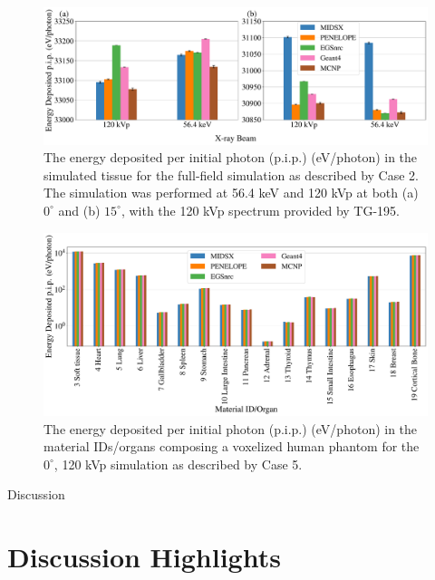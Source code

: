 \documentclass[final]{beamer}
\newlength{\colwidth}
\begin{document}
\begin{frame}[t]
\begin{columns}[t]
\begin{column}{\colwidth}
    \begin{figure}
      \centering
    \includegraphics[width= \colwidth]{radiography_body_dep_paper_ready.pdf}
    \caption{The energy deposited per initial photon (p.i.p.) (eV/photon) in the simulated tissue for the full-field simulation as described by Case 2. The simulation was performed at 56.4 keV and 120 kVp at both (a) $0^\circ$ and (b) $15^\circ$, with the 120 kVp spectrum provided by TG-195.}
     \label{fig:BDGraph}
    \end{figure}

    \begin{figure}
      \centering
    \includegraphics[width= \colwidth]{CT_120_0_big_font.pdf}
    \caption{The energy deposited per initial photon (p.i.p.) (eV/photon) in the material IDs/organs composing a voxelized human phantom for the $0^\circ$, 120 kVp simulation as described by Case 5.}
    \label{fig:CTGraph}
    \end{figure}
  

  \begin{block}{Discussion}
    \section*{Discussion Highlights}


\end{block}
\end{column}
\end{columns}
\end{frame}
\end{document}

